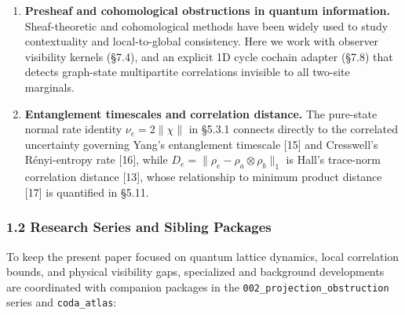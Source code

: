 \documentclass[
  11pt,
]{article}
\begin{document}
\begin{enumerate}
\item
  \textbf{Presheaf and cohomological obstructions in quantum information.} Sheaf-theoretic and cohomological methods have been widely used to study contextuality and local-to-global consistency. Here we work with observer visibility kernels (§7.4), and an explicit 1D cycle cochain adapter (§7.8) that detects graph-state multipartite correlations invisible to all two-site marginals.
\item
  \textbf{Entanglement timescales and correlation distance.} The pure-state normal rate identity \(\nu_e=2\lVert\chi\rVert\) in §5.3.1 connects directly to the correlated uncertainty governing Yang's entanglement timescale {[}15{]} and Cresswell's Rényi-entropy rate {[}16{]}, while \(D_e=\lVert\rho_e-\rho_a\otimes\rho_b\rVert_1\) is Hall's trace-norm correlation distance {[}13{]}, whose relationship to minimum product distance {[}17{]} is quantified in §5.11.
\end{enumerate}

\subsubsection{1.2 Research Series and Sibling Packages}\label{research-series-and-sibling-packages}

To keep the present paper focused on quantum lattice dynamics, local correlation bounds, and physical visibility gaps, specialized and background developments are coordinated with companion packages in the \texttt{002\_projection\_obstruction} series and \texttt{coda\_atlas}:
\end{document}

